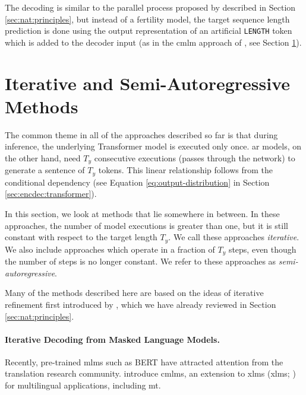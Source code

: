 The decoding is similar to the parallel process proposed by
\citet{gu2017nonautoregressive} described in Section \ref{sec:nat:principles},
but instead of a fertility model, the target sequence length prediction is done
using the output representation of an artificial \texttt{LENGTH} token which is
added to the decoder input (as in the \ac{cmlm} approach of
\citealp{ghazvininejad-etal-2019-mask}, see Section \ref{sec:nat:semi}).

\section{Iterative and Semi-Autoregressive Methods}%
\label{sec:nat:semi}

The common theme in all of the approaches described so far is that during
inference, the underlying Transformer model is executed only once.  \Acl{ar}
models, on the other hand, need $T_y$ consecutive executions (passes through
the network) to generate a sentence of $T_y$ tokens. This linear relationship
follows from the conditional dependency (see Equation
\ref{eq:output-distribution} in Section \ref{sec:encdec:transformer}).

In this section, we look at methods that lie somewhere in between. In these
approaches, the number of model executions is greater than one, but it is still
constant with respect to the target length $T_y$. We call these approaches
\emph{iterative}. We also include approaches which operate in a fraction of
$T_y$ steps, even though the number of steps is no longer constant. We refer to
these approaches as \emph{semi-autoregressive}.

Many of the methods described here are based on the ideas of iterative
refinement first introduced by \citet{lee-etal-2018-deterministic}, which we
have already reviewed in Section \ref{sec:nat:principles}.

\paragraph{Iterative Decoding from Masked Language Models.} Recently,
pre-trained \acp{mlm} such as BERT \citep{devlin-etal-2019-bert} have attracted
attention from the translation research
community. \citet{ghazvininejad-etal-2019-mask} introduce
\acfp{cmlm}, an extension to \aclp{xlm}
(\acsp{xlm}; \citealp{conneau-lample-2019-cross}) for
multilingual applications, including \ac{mt}.

